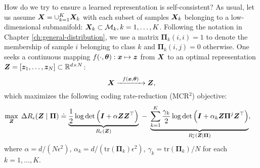 \documentclass[\toplevelprefix/book-main.tex]{subfiles}
\begin{document}
How do we try to ensure a learned representation is self-consistent? As usual, let us assume $\bm{X} = \cup_{k=1}^K \bm{X}_k$ with each subset of samples $\bm{X}_k$ belonging to a low-dimensional submanifold: $\bm{X}_k \subset \mathcal{M}_k, k = 1,\ldots, K$. Following the notation in Chapter \ref{ch:general-distribution}, we use a matrix $\bm \Pi_k(i,i) = 1$ to denote the membership of sample $i$ belonging to class $k$ and $\bm \Pi_k(i,j) = 0$ otherwise. One seeks a continuous mapping $f(\cdot,\bm \theta): \bm{x} \mapsto \bm{z}$ from $\bm{X}$ to an optimal representation $\bm{Z} = [\bm{z}_1, \ldots, \bm{z}_N] \subset \mathbb{R}^{d \times N}$:
\begin{equation}
\bm X  \xrightarrow{\hspace{2mm} f(\bm{x}, \bm \theta) \hspace{2mm}} \bm Z, 
\label{eqn:LDR}
\end{equation}
which maximizes the following coding rate-reduction (MCR$^2$) objective:
\begin{equation}\label{eq:mcr2-formulation}
\begin{split}
\max_{\Z} \; \Delta R_\epsilon(\Z  \mid \bm{\Pi}) %
&\doteq \underbrace{\frac{1}{2}\log\det \Big(\I + {\alpha} \Z \Z^\top \Big)}_{R_{\epsilon}(\Z)} \;-\; \underbrace{\sum_{k=1}^{K}\frac{\gamma_k}{2} \log\det\Big(\I + {\alpha_k} \Z \bm{\Pi}^{j} \Z^\top \Big)}_{R^c_{\epsilon}(\Z \mid \bm \Pi)},
\end{split}
\end{equation}
where $\alpha = {d}/({N\epsilon^2})$, $\alpha_k = d/({\mathrm{tr}(\bm{\Pi}_k)\epsilon^2})$, $\gamma_k =  {\mathrm{tr}(\bm{\Pi}_{k})}/{N}$ for each $k = 1,\dots, K$.
\end{document}
